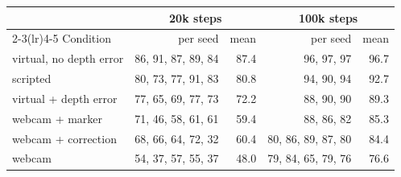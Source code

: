 \begin{tabular}{lrrrr}
\toprule
 & \multicolumn{2}{c}{20k steps} & \multicolumn{2}{c}{100k steps} \\
\cmidrule(lr){2-3}\cmidrule(lr){4-5}
Condition & per seed & mean & per seed & mean \\
\midrule
\condVz{} virtual, no depth error & 86, 91, 87, 89, 84 & 87.4 & 96, 97, 97 & 96.7 \\
\condI{} scripted & 80, 73, 77, 91, 83 & 80.8 & 94, 90, 94 & 92.7 \\
\condIV{} virtual + depth error & 77, 65, 69, 77, 73 & 72.2 & 88, 90, 90 & 89.3 \\
\condV{} webcam + marker & 71, 46, 58, 61, 61 & 59.4 & 88, 86, 82 & 85.3 \\
\condIII{} webcam + correction & 68, 66, 64, 72, 32 & 60.4 & 80, 86, 89, 87, 80 & 84.4 \\
\condII{} webcam & 54, 37, 57, 55, 37 & 48.0 & 79, 84, 65, 79, 76 & 76.6 \\
\bottomrule
\end{tabular}
